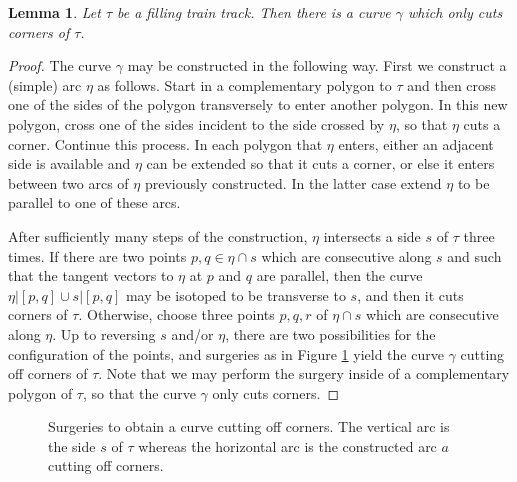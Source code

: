 \documentclass[11pt]{article}
\newtheorem{lemma}[thm]{Lemma}
\theoremstyle{remark}
\begin{document}
\begin{lemma}
  \label{cuttingcorners}
  Let $\tau$ be a filling train track. Then there is a curve $\gamma$ which  only cuts
  corners of $\tau$.
\end{lemma}

\begin{proof}
  The curve $\gamma$ may be constructed in the following way. First we construct a
  (simple) arc $\eta$ as follows. Start in a complementary polygon to $\tau$ and then
  cross one of the sides of the polygon transversely to enter another polygon. In
  this new polygon, cross one of the sides incident to the side crossed by $\eta$, so
  that $\eta$ cuts a corner. Continue this process. In each polygon that $\eta$ enters,
  either an adjacent side is available and $\eta$ can be extended so that
  it cuts a corner, or else it enters between two arcs of $\eta$
  previously constructed. In the latter case extend $\eta$ to be parallel
  to one of these arcs.

  After sufficiently many steps of the construction, $\eta$ intersects a side $s$ of
  $\tau$ three times.
  If there are two points
  $p,q \in \eta \cap s$ which are consecutive along $s$ and such that the tangent vectors to $\eta$
  at $p$ and $q$ are parallel, then the curve
  $\eta|[p,q] \cup s|[p,q]$ may be isotoped to be transverse to $s$, and then it cuts
  corners of $\tau$. Otherwise, choose three points $p,q,r$ of $\eta\cap s$ which are
  consecutive along $\eta$. Up to reversing $s$ and/or $\eta$, there are two possibilities
  for the configuration of the points, and surgeries as in Figure \ref{surgery}
  yield the curve $\gamma$ cutting off corners of $\tau$. Note that we may perform
  the surgery inside of a complementary polygon of $\tau$, so that the curve
  $\gamma$ only cuts corners.
\end{proof}

\begin{figure}[h]

  \centering

  \def\svgwidth{0.9\textwidth}
  

  \caption{Surgeries to obtain a curve cutting off corners. The vertical arc is
    the side $s$ of $\tau$ whereas the horizontal arc is the constructed arc $a$
    cutting off corners.}
  \label{surgery}
\end{figure}
\end{document}
